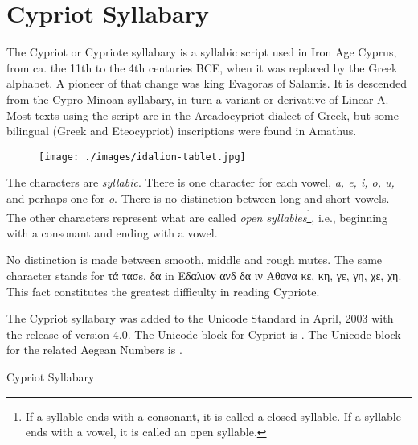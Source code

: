 \section{Cypriot Syllabary}
\label{s:cypriot}
The Cypriot or Cypriote syllabary is a syllabic script used in Iron Age Cyprus, from ca. the 11th to the 4th centuries BCE, when it was replaced by the Greek alphabet. A pioneer of that change was king Evagoras of Salamis. It is descended from the Cypro-Minoan syllabary, in turn a variant or derivative of Linear A. Most texts using the script are in the Arcadocypriot dialect of Greek, but some bilingual (Greek and Eteocypriot) inscriptions were found in Amathus.

\begin{figure}[htb]
\centering
\begin{minipage}{7cm}
\texttt{[image: ./images/idalion-tablet.jpg]}
\end{minipage}\hspace{1.5em}
\begin{minipage}{6cm}
\end{minipage}
\end{figure}


The characters are \textit{syllabic}. There is one character for each  vowel, \textit{a, e, i, o, u,} and perhaps one for \textit{o}. There is no distinction between long and short vowels. The other characters represent what are called \textit{open syllables}\footnote{ If a syllable ends with a consonant, it is called a closed syllable. If a syllable ends with a vowel, it is called an open syllable. }, i.e., beginning with a consonant and ending with a vowel. 

No distinction is made between smooth, middle and rough mutes. The same character stands for τά τ\’ασs, δα in Εδαλιον ανδ δα ιν Αθανα  κε, κη, γε, γη, χε, χη. This fact constitutes the greatest difficulty in reading Cypriote.  

The Cypriot syllabary was added to the Unicode Standard in April, 2003 with the release of version 4.0.
The Unicode block for Cypriot is . The Unicode block for the related Aegean Numbers is .

\newfontfamily{}

\begin{scriptexample}[]{Cypriot Syllabary}

\cypriote {}
\end{scriptexample}


